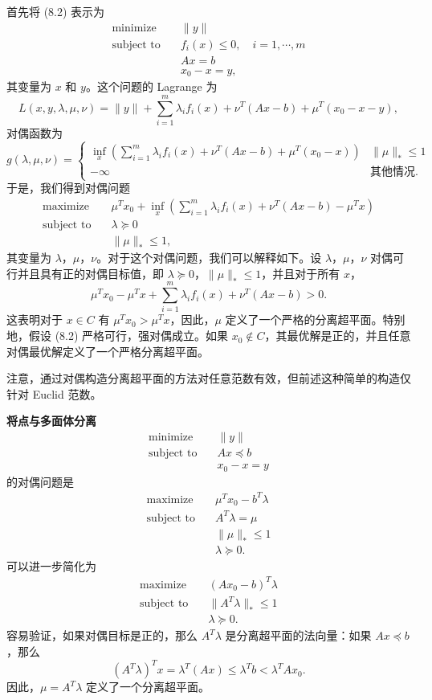 \documentclass[UTF8,12pt,a4paper,fontset=fandol]{ctexart}
\begin{document}
首先将 (8.2) 表示为
\[
\begin{aligned}
\text{minimize}\quad & \|y\|\\
\text{subject to}\quad & f_i(x)\leq 0,\quad i=1,\cdots,m\\
& Ax=b\\
& x_0-x=y,
\end{aligned}
\]
其变量为 $x$ 和 $y$。这个问题的 Lagrange 为
\[
L(x,y,\lambda,\mu,\nu)=\|y\|+\sum_{i=1}^m\lambda_i f_i(x)+\nu^T(Ax-b)+\mu^T(x_0-x-y),
\]
对偶函数为
\[
g(\lambda,\mu,\nu)=
\begin{cases}
\displaystyle\inf_x\left(\sum_{i=1}^m\lambda_i f_i(x)+\nu^T(Ax-b)+\mu^T(x_0-x)\right) & \|\mu\|_\ast\leq 1\\
-\infty & \text{其他情况}.
\end{cases}
\]
于是，我们得到对偶问题
\[
\begin{aligned}
\text{maximize}\quad & \mu^T x_0+\inf_x\left(\sum_{i=1}^m\lambda_i f_i(x)+\nu^T(Ax-b)-\mu^T x\right)\\
\text{subject to}\quad & \lambda\succeq 0\\
& \|\mu\|_\ast\leq 1,
\end{aligned}
\]
其变量为 $\lambda$，$\mu$，$\nu$。对于这个对偶问题，我们可以解释如下。设 $\lambda$，$\mu$，$\nu$ 对偶可行并且具有正的对偶目标值，即 $\lambda\succeq 0$，$\|\mu\|_\ast\leq 1$，并且对于所有 $x$，
\[
\mu^T x_0-\mu^T x+\sum_{i=1}^m\lambda_i f_i(x)+\nu^T(Ax-b)>0.
\]
这表明对于 $x\in C$ 有 $\mu^Tx_0>\mu^Tx$，因此，$\mu$ 定义了一个严格的分离超平面。特别地，假设 (8.2) 严格可行，强对偶成立。如果 $x_0\notin C$，其最优解是正的，并且任意对偶最优解定义了一个严格分离超平面。

注意，通过对偶构造分离超平面的方法对任意范数有效，但前述这种简单的构造仅针对 Euclid 范数。

\noindent\textbf{将点与多面体分离}\quad
\[
\begin{aligned}
\text{minimize}\quad & \|y\|\\
\text{subject to}\quad & Ax\preceq b\\
& x_0-x=y
\end{aligned}
\]
的对偶问题是
\[
\begin{aligned}
\text{maximize}\quad & \mu^T x_0-b^T\lambda\\
\text{subject to}\quad & A^T\lambda=\mu\\
& \|\mu\|_\ast\leq 1\\
& \lambda\succeq 0.
\end{aligned}
\]
可以进一步简化为
\[
\begin{aligned}
\text{maximize}\quad & (Ax_0-b)^T\lambda\\
\text{subject to}\quad & \|A^T\lambda\|_\ast\leq 1\\
& \lambda\succeq 0.
\end{aligned}
\]
容易验证，如果对偶目标是正的，那么 $A^T\lambda$ 是分离超平面的法向量：如果 $Ax\preceq b$，那么
\[
(A^T\lambda)^Tx=\lambda^T(Ax)\leq \lambda^Tb<\lambda^TAx_0.
\]
因此，$\mu=A^T\lambda$ 定义了一个分离超平面。
\end{document}
